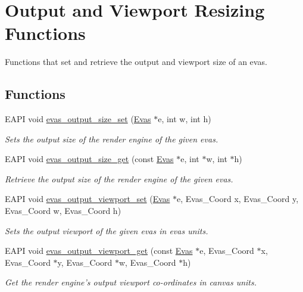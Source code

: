 \section{Output and Viewport Resizing Functions}
\label{group__Evas__Output__Size}


Functions that set and retrieve the output and viewport size of an evas.  


\subsection*{Functions}
\begin{DoxyCompactItemize}
\item 
EAPI void \hyperlink{group__Evas__Output__Size_gaaf571f18f97f4067f554ab7713f01063}{evas\_\-output\_\-size\_\-set} (\hyperlink{group__Evas__Canvas_ga5ff87cc4ce6bc43e3b640a6d37f73043}{Evas} $\ast$e, int w, int h)
\begin{DoxyCompactList}\small\item\em Sets the output size of the render engine of the given evas. \item\end{DoxyCompactList}\item 
EAPI void \hyperlink{group__Evas__Output__Size_ga1f3497644d526ff5ded49b19c1ec732a}{evas\_\-output\_\-size\_\-get} (const \hyperlink{group__Evas__Canvas_ga5ff87cc4ce6bc43e3b640a6d37f73043}{Evas} $\ast$e, int $\ast$w, int $\ast$h)
\begin{DoxyCompactList}\small\item\em Retrieve the output size of the render engine of the given evas. \item\end{DoxyCompactList}\item 
EAPI void \hyperlink{group__Evas__Output__Size_ga1d39edcaff429d884d4a70aa1fca0c08}{evas\_\-output\_\-viewport\_\-set} (\hyperlink{group__Evas__Canvas_ga5ff87cc4ce6bc43e3b640a6d37f73043}{Evas} $\ast$e, Evas\_\-Coord x, Evas\_\-Coord y, Evas\_\-Coord w, Evas\_\-Coord h)
\begin{DoxyCompactList}\small\item\em Sets the output viewport of the given evas in evas units. \item\end{DoxyCompactList}\item 
EAPI void \hyperlink{group__Evas__Output__Size_gab94e38ef64004f0ead8cd8f7a8f69fee}{evas\_\-output\_\-viewport\_\-get} (const \hyperlink{group__Evas__Canvas_ga5ff87cc4ce6bc43e3b640a6d37f73043}{Evas} $\ast$e, Evas\_\-Coord $\ast$x, Evas\_\-Coord $\ast$y, Evas\_\-Coord $\ast$w, Evas\_\-Coord $\ast$h)
\begin{DoxyCompactList}\small\item\em Get the render engine's output viewport co-\/ordinates in canvas units. \item\end{DoxyCompactList}\end{DoxyCompactItemize}


